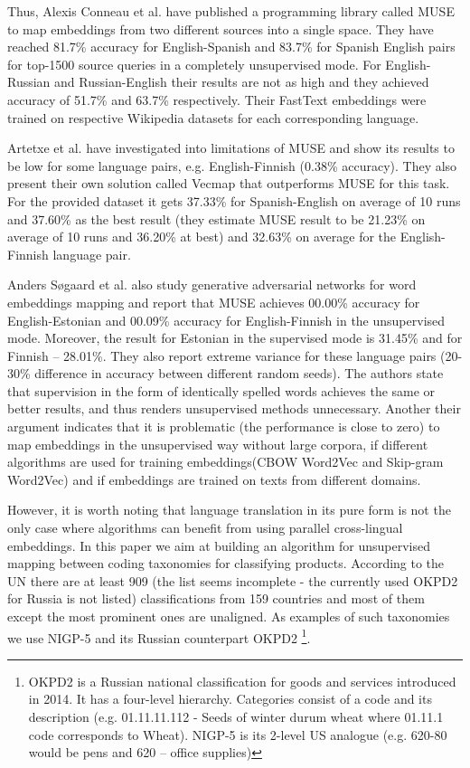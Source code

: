 \documentclass[conference]{IEEEtran}
\begin{document}
Thus, Alexis Conneau et al. \cite{muse} have published a programming library called MUSE to map embeddings from two different sources into a single space. They have reached 81.7\% accuracy for English-Spanish and 83.7\% for Spanish English pairs for top-1500 source queries in a completely unsupervised mode. For English-Russian and Russian-English their results are not as high and they achieved accuracy of 51.7\% and 63.7\% respectively. Their FastText embeddings were trained on respective Wikipedia datasets for each corresponding language. 

Artetxe et al. have investigated into limitations of MUSE and show its results to be low for some language pairs, e.g. English-Finnish (0.38\% accuracy). They also present their own solution called Vecmap \cite{vecmap} that outperforms MUSE for this task. For the provided dataset it gets 37.33\% for Spanish-English on average of 10 runs and 37.60\% as the best result (they estimate MUSE result to be 21.23\% on average of 10 runs and 36.20\% at best) and 32.63\% on average for the English-Finnish language pair.

Anders Søgaard et al. \cite{ruder-muse-limitations} also study generative adversarial networks for word embeddings mapping and report that MUSE achieves 00.00\% accuracy for English-Estonian and 00.09\% accuracy for English-Finnish in the unsupervised mode. Moreover, the result for Estonian in the supervised mode is 31.45\% and for Finnish -- 28.01\%. They also report extreme variance for these language pairs (20-30\% difference in accuracy between different random seeds). The authors state that supervision in the form of identically spelled words achieves the same or better results, and thus renders unsupervised methods unnecessary. Another their argument indicates that it is problematic (the performance is close to zero) to map embeddings in the unsupervised way without large corpora, if different algorithms are used for training embeddings(CBOW Word2Vec and Skip-gram Word2Vec) and if embeddings are trained on texts from different domains.

However, it is worth noting that language translation in its pure form is not the only case where algorithms can benefit from using parallel cross-lingual embeddings. In this paper we aim at building an algorithm for unsupervised mapping between coding taxonomies for classifying products. According to the UN \cite{unsd} there are at least 909 (the list seems incomplete - the currently used OKPD2 for Russia is not listed) classifications from 159 countries and most of them except the most prominent ones are unaligned. As examples of such taxonomies we use NIGP-5 and its Russian counterpart OKPD2 \footnote{OKPD2 is a Russian national classification for goods and services introduced in 2014. It has a four-level hierarchy. Categories consist of a code and its description (e.g. 01.11.11.112 - Seeds of winter durum wheat where 01.11.1 code corresponds to Wheat). NIGP-5 is its 2-level US analogue (e.g. 620-80 would be pens and 620 -- office supplies)}.
\end{document}
